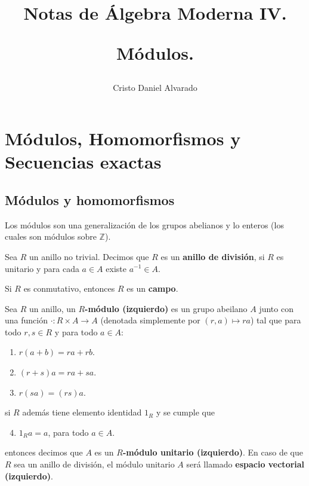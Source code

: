 \documentclass[12pt]{report}
\newcounter{it}
\theoremstyle{largebreak}
\newcommand\cf[3]{\ensuremath{#1:#2\rightarrow#3}}
\begin{document}
    \setlength{\parskip}{5pt} %
    \setlength{\parindent}{12pt} %
    \title{Notas de Álgebra Moderna IV.
    
    Módulos.}
    \author{Cristo Daniel Alvarado}
    \maketitle

    \tableofcontents %


    \chapter{Módulos, Homomorfismos y Secuencias exactas}

    \section{Módulos y homomorfismos}

    Los módulos son una generalización de los grupos abelianos y lo enteros (los cuales son módulos sobre $\mathbb{Z}$).

    \begin{mydef}
        Sea $R$ un anillo no trivial. Decimos que $R$ es un \textbf{anillo de división}, si $R$ es unitario y para cada $a\in A$ existe $a^{-1}\in A$.

        Si $R$ es conmutativo, entonces $R$ es un \textbf{campo}.
    \end{mydef}

    \begin{mydef}
        Sea $R$ un anillo, un \textbf{$R$-módulo (izquierdo)} es un grupo abeilano $A$ junto con una función $\cf{\cdot}{R\times A}{A}$ (denotada simplemente por $(r,a)\mapsto ra$) tal que para todo $r,s\in R$ y para todo $a\in A$:
        \begin{enumerate}[label=\textit{(\arabic*)}]
            \item $r(a+b)=ra+rb$.
            \item $(r+s)a=ra+sa$.
            \item $r(sa)=(rs)a$.
        \end{enumerate}
        si $R$ además tiene elemento identidad $1_R$ y se cumple que
        \begin{enumerate}[label=\textit{(\arabic*)}]
            \setcounter{enumi}{3}
            \item $1_Ra=a$, para todo $a\in A$.
        \end{enumerate}
        entonces decimos que $A$ es un \textbf{$R$-módulo unitario (izquierdo)}. En caso de que $R$ sea un anillo de división, el módulo unitario $A$ será llamado \textbf{espacio vectorial (izquierdo)}.
    \end{mydef}
\end{document}
